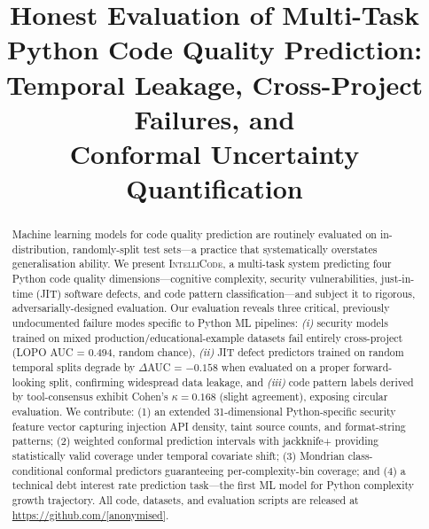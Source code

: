 \documentclass[conference]{IEEEtran}
\begin{document}
\title{Honest Evaluation of Multi-Task Python Code Quality Prediction:\\
Temporal Leakage, Cross-Project Failures, and\\
Conformal Uncertainty Quantification}

\author{
}

\maketitle

\begin{abstract}
Machine learning models for code quality prediction are routinely evaluated
on in-distribution, randomly-split test sets---a practice that systematically
overstates generalisation ability.
We present \textsc{IntelliCode}, a multi-task system predicting four Python
code quality dimensions---cognitive complexity, security vulnerabilities,
just-in-time (JIT) software defects, and code pattern classification---and
subject it to rigorous, adversarially-designed evaluation.
Our evaluation reveals three critical, previously undocumented failure modes
specific to Python ML pipelines:
\emph{(i)} security models trained on mixed production/educational-example
datasets fail entirely cross-project (LOPO AUC = 0.494, random chance),
\emph{(ii)} JIT defect predictors trained on random temporal splits degrade
by $\Delta$AUC = $-0.158$ when evaluated on a proper forward-looking split,
confirming widespread data leakage,
and \emph{(iii)} code pattern labels derived by tool-consensus exhibit
Cohen's $\kappa = 0.168$ (slight agreement), exposing circular evaluation.
We contribute: (1) an extended 31-dimensional Python-specific security feature
vector capturing injection API density, taint source counts, and format-string
patterns; (2) weighted conformal prediction intervals with jackknife$+$
providing statistically valid coverage under temporal covariate shift;
(3) Mondrian class-conditional conformal predictors guaranteeing per-complexity-bin
coverage; and (4) a technical debt interest rate prediction task---the first
ML model for Python complexity growth trajectory.
All code, datasets, and evaluation scripts are released at
\url{https://github.com/[anonymised]}.
\end{abstract}
\end{document}
